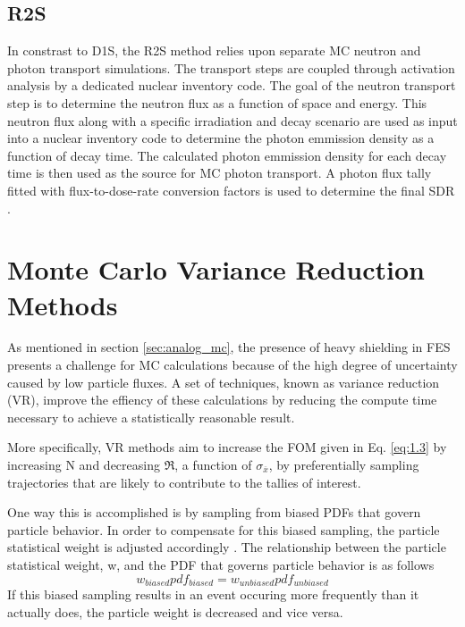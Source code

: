 \subsection{R2S}\label{sec:r2s}
In constrast to D1S, the R2S method relies upon separate MC neutron and photon
transport simulations.  The transport steps are coupled through activation analysis 
by a dedicated nuclear inventory code.
The goal of the neutron transport step is to determine the neutron flux
as a function of space and energy.  This neutron flux along with a specific irradiation
and decay scenario are used as input into a nuclear inventory
code to determine the photon emmission density as a function of decay time.
The calculated photon emmission density for each decay time
is then used as the source for MC photon transport.  A photon flux tally
fitted with flux-to-dose-rate conversion factors is used to
determine the final SDR \cite{r2s}.


\section{Monte Carlo Variance Reduction Methods}\label{sec:vr_methods}

As mentioned in section \ref{sec:analog_mc}, the presence of heavy shielding in
FES presents a challenge for MC calculations because of the high degree of 
uncertainty caused by low particle fluxes. A set of techniques, known as 
variance reduction (VR),
improve the effiency of these calculations by reducing the compute time 
necessary to achieve a statistically reasonable result.

More specifically, VR methods aim to increase the FOM given in Eq. \ref{eq:1.3} 
by increasing N and decreasing $\Re$, a function of $\sigma_{\overline{x}}$,
by preferentially sampling trajectories that are likely to
contribute to the tallies of interest.

One way this is accomplished is by sampling from biased PDFs that govern particle behavior. 
In order to compensate for this biased sampling, the particle statistical weight
is adjusted accordingly \cite{cadis}.
The relationship between the particle statistical weight, w, and the PDF that
governs particle behavior is as follows
\begin{equation} \label{eq:2.1}
		w_{biased} pdf_{biased} = w_{unbiased} pdf_{unbiased}
\end{equation}
If this biased sampling results in an event occuring more frequently than it actually does,
the particle weight is decreased and vice versa.


